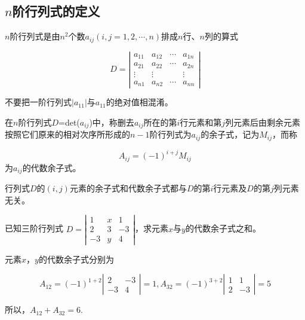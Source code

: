 \subsection{$n$阶行列式的定义}

\begin{definition}[$n$阶行列式]
    $n$阶行列式是由$n^2$个数$a_{ij}(i,j=1,2,\cdots,n)$排成$n$行、$n$列的算式

    $$D = \left|\begin{array}{ccccc}
            a_{11} & a_{12} & \cdots & a_{1n} \\
            a_{21} & a_{22} & \cdots & a_{2n} \\
            \vdots & \vdots &        & \vdots \\
            a_{n1} & a_{n2} & \cdots & a_{nn}
        \end{array}\right|$$
\end{definition}

\begin{remark}
    不要把一阶行列式$\left | a_{11} \right |$与$a_{11}$的绝对值相混淆。
\end{remark}

\begin{definition}[余子式和代数余子式]
    在$n$阶行列式$D$=det($a_{ij}$)中，称删去$a_{ij}$所在的第$i$行元素和第$j$列元素后由剩余元素按照它们原来的相对次序所形成的$n-1$阶行列式为$a_{ij}$的余子式，记为$M_{ij}$，而称

    $$
        A_{ij}=(-1)^{i+j}M_{ij}
    $$
    为$a_{ij}$的代数余子式。
\end{definition}

\begin{remark}
    行列式$D$的$(i,j)$元素的余子式和代数余子式都与$D$的第$i$行元素及$D$的第$j$列元素无关。
\end{remark}

\begin{example}
    已知三阶行列式
    $D=\left|\begin{array}{ccc}
            1  & x & 1  \\
            2  & 3 & -3 \\
            -3 & y & 4
        \end{array}\right| $，求元素$x$与$y$的代数余子式之和。
\end{example}
\begin{solution}
    元素$x$，$y$的代数余子式分别为

    $$A_{12}=(-1)^{1+2}\left|\begin{array}{ccccc}
            2  & -3 \\
            -3 & 4
        \end{array}\right|=1,A_{32}
        =(-1)^{3+2}
        \left|\begin{array}{ccccc}
            1 & 1  \\
            2 & -3
        \end{array}\right|=5
    $$

    所以，$A_{12}+A_{32}=6.$
\end{solution}

